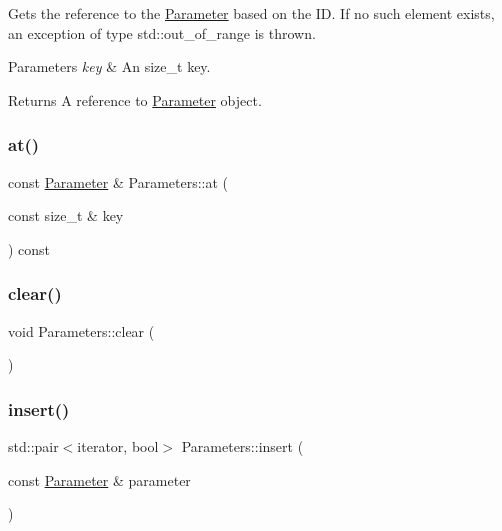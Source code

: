 Gets the reference to the \mbox{\hyperlink{class_parameter}{Parameter}} based on the ID. If no such element exists, an exception of type std\+::out\+\_\+of\+\_\+range is thrown.


\begin{DoxyParams}{Parameters}
{\em key} & An size\+\_\+t key. \\
\hline
\end{DoxyParams}
\begin{DoxyReturn}{Returns}
A reference to \mbox{\hyperlink{class_parameter}{Parameter}} object. 
\end{DoxyReturn}
\mbox{\label{class_parameters_aa52d49e7e5d0e112a90a3cd288c477ce}} 
\subsubsection{\texorpdfstring{at()}{at()}\hspace{0.1cm}{\footnotesize\ttfamily [2/2]}}
{\footnotesize\ttfamily const \mbox{\hyperlink{class_parameter}{Parameter}} \& Parameters\+::at (\begin{DoxyParamCaption}\item[{const size\+\_\+t \&}]{key }\end{DoxyParamCaption}) const}

\mbox{\label{class_parameters_aa28dc24da9d17a3c83069b3817246f8c}} 
\subsubsection{\texorpdfstring{clear()}{clear()}}
{\footnotesize\ttfamily void Parameters\+::clear (\begin{DoxyParamCaption}{ }\end{DoxyParamCaption})}

\mbox{\label{class_parameters_ab643a6115d93d3142247f4a3ecf79d59}} 
\subsubsection{\texorpdfstring{insert()}{insert()}}
{\footnotesize\ttfamily std\+::pair$<$iterator, bool$>$ Parameters\+::insert (\begin{DoxyParamCaption}\item[{const \mbox{\hyperlink{class_parameter}{Parameter}} \&}]{parameter }\end{DoxyParamCaption})\hspace{0.3cm}{\ttfamily [inline]}}

